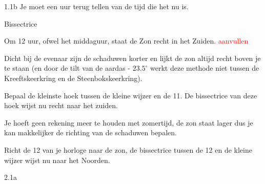 \begin{Antwoord}{1.1b}
            Je moet een uur terug tellen van de tijd die het nu is.
        
\end{Antwoord}
\begin{Antwoord}{1.3}
         Bissectrice
    
\end{Antwoord}
\begin{Antwoord}{1.5}
        Om 12 uur, ofwel het middaguur, staat de Zon recht in het Zuiden. \textcolor{red}{aanvullen}
    
\end{Antwoord}
\begin{Antwoord}{1.6}
        Dicht bij de evenaar zijn de schaduwen korter en lijkt de zon altijd recht boven je te staan (en door de tilt van de aardas - $23.5^{\circ}$ werkt deze methode niet tussen de Kreeftskeerkring en de Steenbokskeerkring).
    
\end{Antwoord}
\begin{Antwoord}{1.7}
        Bepaal de kleinste hoek tussen de kleine wijzer en de 11. De bissectrice van deze hoek wijst nu recht naar het zuiden.
    
\end{Antwoord}
\begin{Antwoord}{1.8}
        Je hoeft geen rekening meer te houden met zomertijd, de zon staat lager dus je kan makkelijker de richting van de schaduwen bepalen.
    
\end{Antwoord}
\begin{Antwoord}{1.10}
        Richt de 12 van je horloge naar de zon, de bissectrice tussen de 12 en de kleine wijzer wijst nu naar het Noorden.
    
\end{Antwoord}
\begin{Antwoord}{2.1a}
		
\end{Antwoord}
